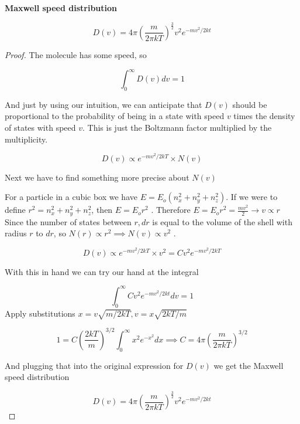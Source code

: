 \documentclass[10pt]{article}
\begin{document}
\begin{definition}
	\textbf{ Maxwell speed distribution }

	\begin{equation}
		D(v) = 4\pi \left( \frac{m}{2\pi kT} \right)^{\frac{3}{2}} v^2 e^{-mv^2 / 2kt}
		\label{def:294:maxwell_distribution}
	\end{equation}
	

	\begin{proof}
		The molecule has some speed, so

		\begin{equation}
			\int_{0}^{\infty}  D(v)dv = 1 
		\end{equation}

		And just by using our intuition, we can anticipate that $ D(v) $  should be proportional to the probability of being in a state with speed $ v $ times the density of states with speed $ v $.
		This is just the Boltzmann factor multiplied by the multiplicity.

		\begin{equation}
			D(v) \propto e^{-mv^2 / 2kT}  \times N(v)
		\end{equation}

		Next we have to find something more precise about $ N(v) $ 

		For a particle in a cubic box we have $ E = E_o (n_x^2 + n_y^2 + n_z^2) $. 
		If we were to define $ r^2 = n_x^2 + n_y^2 + n_z^2  $, then $ E = E_o r^2 $ .
		Therefore $ E = E_o r^2 = \frac{mv^2}{2} \rightarrow v \propto r $
		Since the number of states between $ r, dr $ is equal to the volume of the shell with radius $ r $ to $ dr $, so  $N(r) \propto r^2 \implies N(v) \propto v^2$ . 
		
		\begin{equation}
			D(v) \propto e^{-mv^2 / 2kT} \times  v^2 = Cv^2 e^{-mv^2 / 2kT}
		\end{equation}

		With this in hand we can try our hand at the integral

		\begin{equation}
			\int_{0}^{\infty} Cv^2 e^{-mv^2 / 2kt} dv = 1
		\end{equation}
		Apply substitutions $ x = v\sqrt{m /2kT}, v = x\sqrt{2kT /m} $ 

		\begin{equation}
			1 = C(\frac{2kT}{m})^{3 /2} \int_{0}^{\infty} x^2 e^{-x^2} dx \implies C = 4\pi(\frac{m}{2\pi kT})^{3 /2}
		\end{equation}

		And plugging that into the original expression for $ D(v) $ we get the Maxwell speed distribution
		
	\begin{equation}
		D(v) = 4\pi \left( \frac{m}{2\pi kT} \right)^{\frac{3}{2}} v^2 e^{-mv^2 / 2kt}
	\end{equation}


	\end{proof}
	
\end{definition}
\end{document}
